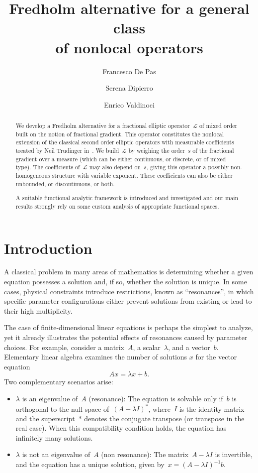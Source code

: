 \documentclass[11pt,hyp,]{nyjm}
\title[Fredholm alternative for nonlocal operators]{Fredholm alternative for a general class\\ of nonlocal operators}
\author{Francesco De Pas}
\author{Serena Dipierro}
\author{Enrico Valdinoci}
\numberwithin{equation}{section}
\theoremstyle{remark}
\begin{document}
\begin{abstract}
We develop a Fredholm alternative for a fractional elliptic operator~$\mathcal{L}$ of mixed order built on the notion of fractional gradient. This operator constitutes the nonlocal extension of the classical second order elliptic operators with measurable coefficients treated by Neil Trudinger in~\cite{trudinger}. We build~$\mathcal{L}$ by weighing the order~$s$ of the fractional gradient over a measure
(which can be either continuous, or discrete, or of mixed type). The coefficients of~$\mathcal{L}$ may also depend on~$s$, giving this operator a possibly non-homogeneous structure with variable exponent.
These coefficients can also be either unbounded, or discontinuous, or both.

A suitable functional analytic framework is introduced and investigated and our main results strongly rely on some custom analysis of appropriate functional spaces. 
\end{abstract}

\maketitle
\tableofcontents

\section{Introduction}\label{intro}

A classical problem in many areas of mathematics is determining whether a given equation possesses a solution and, if so, whether the solution is unique. In some cases, physical constraints introduce restrictions, known as ``resonances'', in which
specific parameter configurations either prevent solutions from existing or lead to their high multiplicity.

The case of finite-dimensional linear equations is perhaps the simplest to analyze, yet it already illustrates the potential effects of resonances caused by parameter choices. For example, consider a matrix~\(A\), a scalar~\(\lambda\), and a vector~\(b\). Elementary linear algebra examines the number of solutions \(x\) for the vector equation
\[
Ax = \lambda x + b.
\]
Two complementary scenarios arise:
\begin{itemize}
    \item\(\lambda\) is an eigenvalue of~\(A\) (resonance): The equation is solvable only if~\(b\) is orthogonal to the null space of~\((A - \lambda I)^*\), where~\(I\) is the identity matrix and the superscript~\(*\) denotes the conjugate transpose (or transpose in the real case). When this compatibility condition holds, the equation has infinitely many solutions.
    \item  \(\lambda\) is not an eigenvalue of~\(A\) (non resonance): The matrix~\(A - \lambda I\) is invertible, and the equation has a unique solution, given by~$x = (A - \lambda I)^{-1}b$.
\end{itemize}
\end{document}
